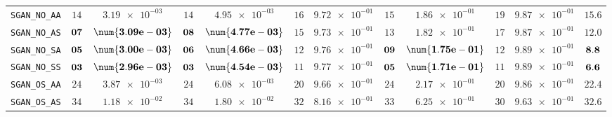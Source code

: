 \begin{xltabular}{\textwidth}{l||cC|cC|cC|cC|cC||c}
	\texttt{SGAN\_NO\_AA} & $ 14$ & $ \num{3.19e-03}$ & $ 14$ & $ \num{4.95e-03}$ & $ 16$ & $ \num{9.72e-01}$ & $ 15$ & $ \num{1.86e-01}$ & $ 19$ & $ \num{9.87e-01}$ & $ 15.6$  \\
	\texttt{SGAN\_NO\_AS} & $\bf 07$ & $\bf \num{3.09e-03}$ & $\bf 08$ & $\bf \num{4.77e-03}$ & $ 15$ & $ \num{9.73e-01}$ & $ 13$ & $ \num{1.82e-01}$ & $ 17$ & $ \num{9.87e-01}$ & $ 12.0$  \\
	\texttt{SGAN\_NO\_SA} & $\bf 05$ & $\bf \num{3.00e-03}$ & $\bf 06$ & $\bf \num{4.66e-03}$ & $ 12$ & $ \num{9.76e-01}$ & $\bf 09$ & $\bf \num{1.75e-01}$ & $ 12$ & $ \num{9.89e-01}$ & $\bf 8.8$  \\
	\texttt{SGAN\_NO\_SS} & $\bf 03$ & $\bf \num{2.96e-03}$ & $\bf 03$ & $\bf \num{4.54e-03}$ & $ 11$ & $ \num{9.77e-01}$ & $\bf 05$ & $\bf \num{1.71e-01}$ & $ 11$ & $ \num{9.89e-01}$ & $\bf 6.6$  \\
	\texttt{SGAN\_OS\_AA} & $ 24$ & $ \num{3.87e-03}$ & $ 24$ & $ \num{6.08e-03}$ & $ 20$ & $ \num{9.66e-01}$ & $ 24$ & $ \num{2.17e-01}$ & $ 20$ & $ \num{9.86e-01}$ & $ 22.4$  \\
	\texttt{SGAN\_OS\_AS} & $ 34$ & $ \num{1.18e-02}$ & $ 34$ & $ \num{1.80e-02}$ & $ 32$ & $ \num{8.16e-01}$ & $ 33$ & $ \num{6.25e-01}$ & $ 30$ & $ \num{9.63e-01}$ & $ 32.6$  \\

\end{xltabular}
